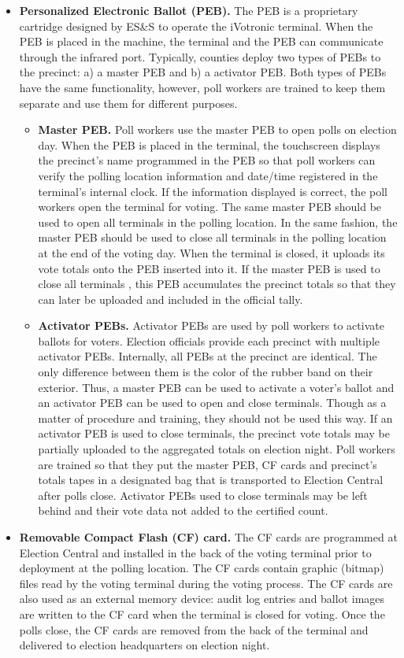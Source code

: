 \begin{itemize}
\item \textbf{Personalized Electronic Ballot (PEB).} The PEB is a proprietary cartridge designed by ES\&S to operate the iVotronic terminal.  When the PEB is placed in the machine, the terminal and the PEB can communicate through the infrared port.  Typically, counties deploy two types of PEBs to the precinct: a) a master PEB and b) a activator PEB. Both types of PEBs have the same functionality, however, poll workers are trained to keep them separate and use them for different purposes.
    \begin{itemize}
    \item \textbf{Master PEB.}  Poll workers use the master PEB to open polls on election day. When the PEB is placed in the terminal, the touchscreen displays the precinct's name programmed in the PEB so that poll workers can verify the polling location information and date/time registered in the terminal's internal clock. If the information displayed is correct, the poll workers open the terminal for voting. The same master PEB should be used to open all terminals in the polling location. In the same fashion, the master PEB should be used to close all terminals in the polling location at the end of the voting day. When the terminal is closed, it uploads its vote totals onto the PEB inserted into it. If the master PEB is used to close all terminals , this PEB accumulates the precinct totals so that they can later be uploaded and included in the official tally.
    \item \textbf{Activator PEBs.}  Activator PEBs are used by  poll workers to activate ballots for voters. Election officials provide each precinct with multiple activator PEBs. Internally, all PEBs at the precinct are identical. The only difference between them is the color of the rubber band on their exterior. Thus, a master PEB can be used to activate a voter's ballot and an activator PEB can be used to open and close terminals. Though as a matter of procedure and training, they should not be used this way. If an activator PEB is used to close terminals, the precinct vote totals may be partially uploaded to the aggregated totals on election night. Poll workers are trained so that they put the master PEB, CF cards and precinct's totals tapes in a designated bag that is transported to Election Central after polls close.  Activator PEBs used to close terminals may be left behind and their vote data not added to the certified count.
    \end{itemize}
\item \textbf{Removable Compact Flash (CF) card.} The CF cards are programmed at Election Central and installed in the back of the voting terminal prior to deployment at the polling location. The CF cards contain graphic (bitmap) files read by the voting terminal during the voting process. The CF cards are also used as an external memory device: audit log entries and ballot images are written to the CF card when the terminal is closed for voting. Once the polls close, the CF cards are removed from the back of the terminal and delivered to election headquarters on election night. 


\end{itemize}
